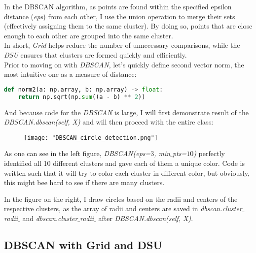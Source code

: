 \documentclass{article}
\begin{document}
	In the DBSCAN algorithm, as points are found within the specified epsilon distance (\textit{eps}) from each other, I use the union operation to merge their sets (effectively assigning them to the same cluster). By doing so, points that are close enough to each other are grouped into the same cluster. \\
	
	In short, \textit{Grid} helps reduce the number of unnecessary comparisons, while the \textit{DSU} ensures that clusters are formed quickly and efficiently. \\
	
	Prior to moving on with \textit{DBSCAN}, let's quickly define second vector norm, the most intuitive one as a measure of distance:
	
	\begin{lstlisting}[language=python]
def norm2(a: np.array, b: np.array) -> float:
	return np.sqrt(np.sum((a - b) ** 2))\end{lstlisting}

	And because code for the \textit{DBSCAN} is large, I will first demonstrate result of the \textit{DBSCAN.dbscan(self, X)} and will then proceed with the entire class:
	
	\begin{figure}[H]
		\centering
		\texttt{[image: "DBSCAN\_circle\_detection.png"]}
	\end{figure}
	
	As one can see in the left figure, \textit{DBSCAN(eps=$3$, min$\_$pts=$10$)} perfectly identified all 10 different clusters and gave each of them a unique color. Code is written such that it will try to color each cluster in different color, but obviously, this might bee hard to see if there are many clusters. 
	
	In the figure on the right, I draw circles based on the radii and centers of the respective clusters, as the array of radii and centers are saved in \textit{dbscan.cluster$\_$radii$\_$} and \textit{dbscan.cluster$\_$radii$\_$} after \textit{DBSCAN.dbscan(self, X)}. 
	
	\newpage
	\subsection*{DBSCAN with Grid and DSU}
	
\end{document}
